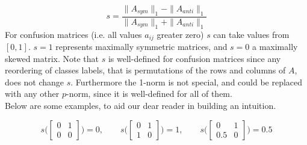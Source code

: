 \documentclass{article}
\begin{document}
\begin{equation}
	s = \frac{ \|A_{sym}\|_1 - \|A_{anti}\|_1}{\|A_{sym}\|_1 + \|A_{anti}\|_1}
\end{equation}
For confusion matrices (i.e. all values $a_{ij}$ greater zero) $s$ can take values from $[0,1]$. $s = 1$ represents maximally symmetric matrices, and $s = 0$ a maximally skewed matrix.
Note that $s$ is well-defined for confusion matrices since any reordering of classes labels, that is permutations of the rows and columns of $A$, does not change $s$. Furthermore the 1-norm is not special, and could be replaced with any other $p$-norm, since it is well-defined for all of them.\\
Below are some examples, to aid our dear reader in building an intuition.

\begin{equation*}
	s\bigg(\begin{bmatrix}
		0 & 1 \\
		0 & 0
	\end{bmatrix}\bigg) = 0, \qquad
%
	s\bigg(\begin{bmatrix}
		0 & 1 \\
		1 & 0
	\end{bmatrix}\bigg) = 1, \qquad
%
	s\bigg( \begin{bmatrix}
		0 & 1 \\
		0.5 & 0
	\end{bmatrix}\bigg) = 0.5
\end{equation*}
%
%
\end{document}
